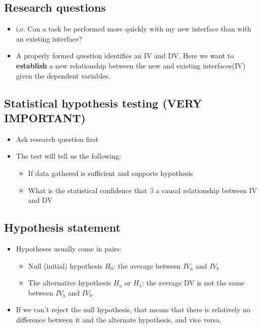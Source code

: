 \documentclass[12pt]{book}
\begin{document}
\subsection*{Research questions}
\begin{itemize}
  \item i.e. Can a task be performed more quickly with my new interface than with an existing interface?
  \item A properly formed question identifies an IV and DV. Here we want to \textbf{establish} a new relationship between the new and existing interfaces(IV) given the dependent variables.
\end{itemize}

\subsection*{Statistical hypothesis testing (VERY IMPORTANT)}

\begin{itemize}
  \item Ask research question first
  \item The test will tell us the following:
  \begin{itemize}
    \item If data gathered is sufficient and supports hypothesis
    \item What is the statistical confidence that $\exists$ a causal relationship between IV and DV
  \end{itemize}
\end{itemize}

\subsection*{Hypothesis statement}

\begin{itemize}
  \item Hypotheses usually come in pairs:
  \begin{itemize}
    \item Null (initial) hypothesis $H_0$: the average between $IV_a$ and $IV_b$
    \item The alternative hypothesis $H_a$ or $H_1$: the average DV is not the same between $IV_a$ and $IV_b$.
  \end{itemize} 

  \item If we can't reject the null hypothesis, that means that there is relatively no difference between it and the alternate hypothesis, and vice versa.
  
\end{itemize}
\end{document}
